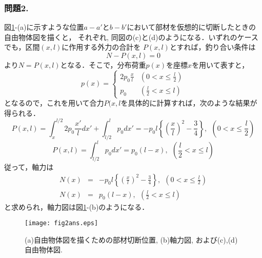 \documentclass[10pt,a4j]{jarticle}
\begin{document}
\subsubsection*{問題2.}
図\ref{fig:fig2}-(a)に示すような位置$a-a'$と$b-b'$において部材を仮想的に切断したときの自由物体図を描くと，
それぞれ, 同図の(c)と(d)のようになる．いずれのケースでも，区間$(x,l)$に作用する外力の合計を
$P(x,l)$とすれば，釣り合い条件は
\begin{equation}
	N-P(x,l)=0
\end{equation}
より$N=P(x,l)$となる．そこで，分布荷重$p(x)$を座標$x$を用いて表すと，
\begin{equation}
	p(x)=\left\{
		\begin{array}{cc}
			2p_0 \frac{x}{l} & \left(0 < x \leq \frac{l}{2}\right) \\
			p_0  & \left(\frac{l}{2}< x \leq l \right) 
		\end{array}
	\right.
\end{equation}
となるので，これを用いて合力$P(x,l$を具体的に計算すれば，次のような結果が得られる．
\begin{equation}
	P(x,l)=
	\int_x^{l/2} 2p_0 \frac{x'}{l}dx'
	+
	\int_{l/2}^l  p_0 dx'
	=
	-p_0l\left\{ \left( \frac{x}{l}\right)^2 -\frac{3}{4}\right\} , \ \ 
	 \left(0 < x \leq \frac{l}{2}\right) 
\end{equation}
\begin{equation}
	P(x,l)=
	\int_{l/2}^l  p_0 dx'=p_0(l-x), \ \  \left(\frac{l}{2}< x \leq l \right) 
\end{equation}
従って，軸力は
\begin{eqnarray}
	N(x) &= & -p_0l\left\{ \left( \frac{x}{l}\right)^2 -\frac{3}{4}\right\} , 
	\ \ \left(0 < x \leq \frac{l}{2}\right)  \\
	N(x) &= & 
	p_0(l-x), \ \  \left(\frac{l}{2}< x \leq l \right) 
\end{eqnarray}
と求められ，軸力図は図\ref{fig:fig2}-(b)のようになる．
\begin{figure}[h]
	\vspace{-3mm}
	\begin{center}
	\texttt{[image: fig2ans.eps]} 
	\end{center}
	\vspace{-5mm}
	\caption{(a)自由物体図を描くための部材切断位置, (b)軸力図,
	および(c),(d)自由物体図.} 
	\label{fig:fig2}
\end{figure}
\end{document}
